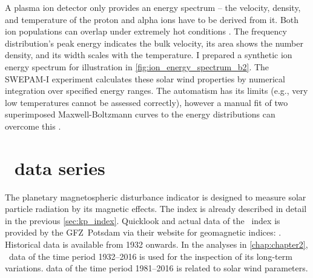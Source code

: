 A plasma ion detector only provides an energy spectrum -- the velocity, density, and temperature of the proton and alpha ions have to be derived from it. Both ion populations can overlap under extremely hot conditions \citep{Bame1992}. The frequency distribution's peak energy indicates the bulk velocity, its area shows the number density, and its width scales with the temperature. I prepared a synthetic ion energy spectrum for illustration in \autoref{fig:ion_energy_spectrum_b2}. The SWEPAM-I experiment calculates these solar wind properties by numerical integration over specified energy ranges. The automatism has its limits (e.g., very low temperatures cannot be assessed correctly), however a manual fit of two superimposed Maxwell-Boltzmann curves to the energy distributions can overcome this \citep{Bame1992}.


\section{\Kp~data series}
\label{sec:kp_data}
The planetary magnetospheric disturbance indicator \Kp{} is designed to measure solar particle radiation by its magnetic effects. The index is already described in detail in the previous \autoref{sec:kp_index}. Quicklook and actual data of the \Kp~index is provided by the GFZ~Potsdam via their website for geomagnetic indices: \mbox{}. Historical data is available from 1932 onwards.
In the analyses in \autoref{chap:chapter2}, \Kp~data of the time period 1932--2016 is used for the inspection of its long-term variations. \Kp{} data of the time period 1981--2016 is related to solar wind parameters.




